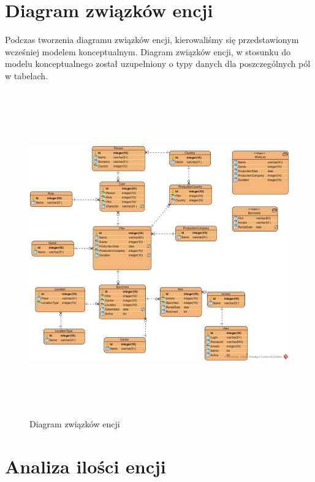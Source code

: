 \documentclass{article}
\begin{document}
	\section{Diagram związków encji}
	Podczas tworzenia diagramu związków encji, kierowaliśmy się przedstawionym wcześniej modelem konceptualnym. Diagram związków encji, w stosunku do modelu konceptualnego został uzupełniony o typy danych dla poszczególnych pól w tabelach.
		\begin{figure}[!ht]	
		\centering
		\includegraphics[height=14cm]{diagram_zwiazkow_encji.jpg}
		\caption{Diagram związków encji}
		\label{fig:obrazek 2}
	\end{figure}
\newpage
\section{Analiza ilości encji}
\end{document}
